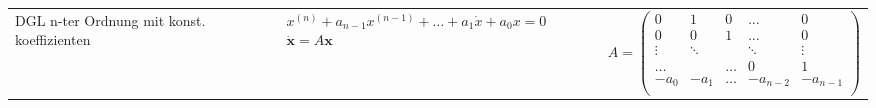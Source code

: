 \begin{tabularx}{\columnwidth}{p{3cm}XX}
	DGL n-ter Ordnung mit konst. koeffizienten & $ x^{(n)} + a_{n-1}x^{(n-1)} + \dots + a_1\dot x + a_0 x = 0$  \newline $\bm{\dot x} = A\bm x$ & 
	$A = \begin{pmatrix}
	0 & 1 & 0 & \dots & 0 \\ 0 & 0 & 1 & \dots & 0 \\ \vdots & \ddots &   & \ddots & \vdots \\ \dots &   & \dots & 0 & 1 \\ -a_0 & -a_1 &  \dots & -a_{n-2} & -a_{n-1}\\
	\end{pmatrix}$\\
	
			
	\end{tabularx}